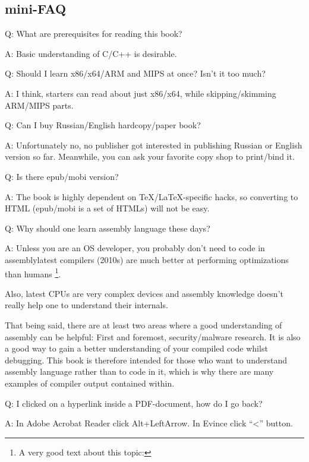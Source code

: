 \subsection*{mini-FAQ}

\par Q: What are prerequisites for reading this book?
\par A: Basic understanding of C/C++ is desirable.

\par Q: Should I learn x86/x64/ARM and MIPS at once? Isn't it too much?
\par A: I think, starters can read about just x86/x64, while skipping/skimming ARM/MIPS parts.

\par Q: Can I buy Russian/English hardcopy/paper book?
\par A: Unfortunately no, no publisher got interested in publishing Russian or English version so far.
Meanwhile, you can ask your favorite copy shop to print/bind it.

\par Q: Is there epub/mobi version?
\par A: The book is highly dependent on TeX/LaTeX-specific hacks, so converting to HTML (epub/mobi is a set of HTMLs)
will not be easy.

\par Q: Why should one learn assembly language these days?
\par A: Unless you are an \ac{OS} developer, you probably don't need to code in assembly\textemdash{}latest compilers (2010s) are much better at performing optimizations than humans \footnote{A very good text about this topic: \InSqBrackets{\AgnerFog}}.

Also, latest \ac{CPU}s are very complex devices and assembly knowledge doesn't really help one to understand their internals.

That being said, there are at least two areas where a good understanding of assembly can be helpful: 
First and foremost, security/malware research. It is also a good way to gain a better understanding of your compiled code whilst debugging.
This book is therefore intended for those who want to understand assembly language rather 
than to code in it, which is why there are many examples of compiler output contained within.

\par Q: I clicked on a hyperlink inside a PDF-document, how do I go back?
\par A: In Adobe Acrobat Reader click Alt+LeftArrow. In Evince click ``<'' button.

